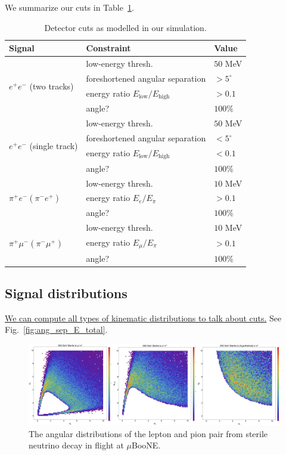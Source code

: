 \documentclass[11pt, a4paper]{article}
\newcommand{\reffig}[1]{Fig.~\ref{#1}}
\newcommand{\reftab}[1]{Table~\ref{#1}}
\newcommand{\newtext}[2]{\textcolor{#1}{\ul{#2}}}
\begin{document}
We summarize our cuts in \reftab{tab:cuts}.
%
\begin{table}[t]
\centering
\begin{tabular}{ l | l | l}
Signal & Constraint & Value \\
\hline\hline
 \multirow{4}{*}{$e^+ e^-$ (two tracks)} & low-energy thresh. & $50$ MeV\\
 \cline{2-3}
 & foreshortened angular separation & $>5^\circ$ \\
 \cline{2-3}
 & energy ratio $E_\text{low}/E_\text{high}$ & $>0.1$\\
 \cline{2-3}
 & angle? & $100\%$\\
\cline{1-3}
 \multirow{4}{*}{$e^+ e^-$ (single track)} & low-energy thresh. & $50$ MeV\\
 \cline{2-3}
 & foreshortened angular separation & $<5^\circ$ \\
 \cline{2-3}
 & energy ratio $E_\text{low}/E_\text{high}$ & $<0.1$\\
 \cline{2-3}
 & angle? & $100\%$\\
\cline{1-3}
 \multirow{3}{*}{$\pi^+e^-(\pi^-e^+)$} & low-energy thresh. & $10$ MeV\\
 \cline{2-3}
 & energy ratio $E_e/E_\pi$ & $>0.1$\\
 \cline{2-3}
 & angle? & $100\%$\\
\cline{1-3}
 \multirow{3}{*}{$\pi^+\mu^-(\pi^-\mu^+)$} & low-energy thresh. & $10$ MeV\\
\cline{2-3}
 & energy ratio $E_\mu/E_\pi$ & $>0.1$\\
\cline{2-3}
 & angle? & $100\%$\\
\end{tabular}
\caption{\label{tab:cuts}Detector cuts as modelled in our simulation.}
\end{table}
\newpage
\newpage

\subsection{Signal distributions}

\newtext{PB}{We can compute all types of kinematic distributions to talk about
cuts.} See \reffig{fig:ang_sep_E_total}.

\begin{figure}[t]
\center
\includegraphics[width=1.0\textwidth,clip,trim=0 0 0 0]{figures/all_dist.pdf}

\caption{\label{fig:all_dist} The angular distributions of the lepton and pion pair from sterile neutrino decay in flight at $\mu$BooNE. }

\end{figure}
\end{document}
